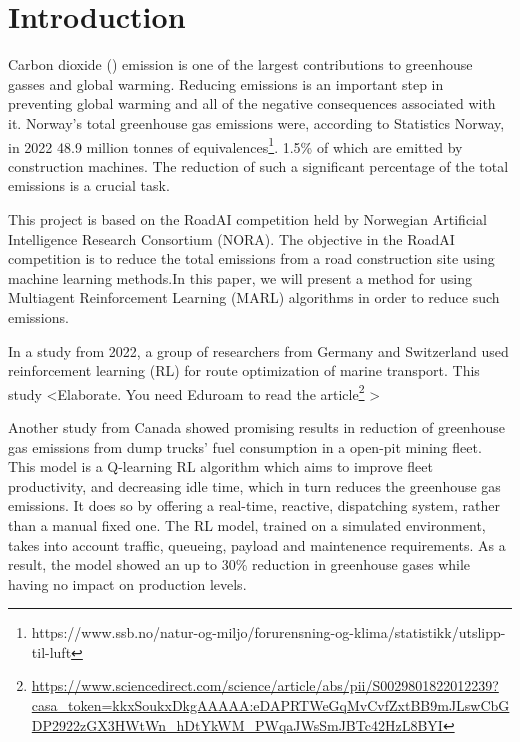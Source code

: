 \documentclass[conference]{IEEEtran}
\begin{document}
\section{Introduction}
Carbon dioxide (\coo{}) emission is one of the largest contributions to greenhouse gasses and global warming.
Reducing \coo{} emissions is an important step in preventing global warming and all of the negative
consequences associated with it. Norway's total greenhouse gas emissions were, according to Statistics
Norway, in 2022 48.9 million tonnes of \coo{}
equivalences\footnote{https://www.ssb.no/natur-og-miljo/forurensning-og-klima/statistikk/utslipp-til-luft}.
1.5\% of which are emitted by construction machines. \cite{noraRoadAIReducing} The reduction of such
a significant percentage of the total emissions is a crucial task.

This project is based on the RoadAI competition held by Norwegian Artificial Intelligence Research
Consortium (NORA). \cite{noraRoadAIReducing} The objective in the RoadAI competition is to reduce the
total \coo{} emissions from a road construction site using machine learning methods.In this paper, we will
present a method for using Multiagent Reinforcement Learning (MARL) algorithms in order to reduce such
emissions.

In a study from 2022, a group of researchers from Germany and Switzerland used reinforcement learning
(RL) for route optimization of marine transport. \cite{MORADI2022111882} This study \textless Elaborate. You need
Eduroam to read the article\footnote{\url{https://www.sciencedirect.com/science/article/abs/pii/S0029801822012239?casa_token=kkxSoukxDkgAAAAA:eDAPRTWeGqMvCvfZxtBB9mJLswCbGDP2922zGX3HWtWn_hDtYkWM_PWqaJWsSmJBTc42HzL8BYI}} \textgreater

Another study from Canada \cite{HUO2023106664} showed promising results in reduction of greenhouse gas
emissions
from dump trucks' fuel consumption in a open-pit mining fleet. This model is a Q-learning RL algorithm
which aims to improve fleet productivity, and decreasing idle time, which in turn reduces the greenhouse
gas emissions. It does so by offering a real-time, reactive,  dispatching system, rather than a manual
fixed one. The RL model, trained on a simulated environment, takes into account traffic, queueing,
payload and maintenence requirements. As a result, the model showed an up to 30\% reduction in greenhouse
gases while having no impact on production levels.
\end{document}
